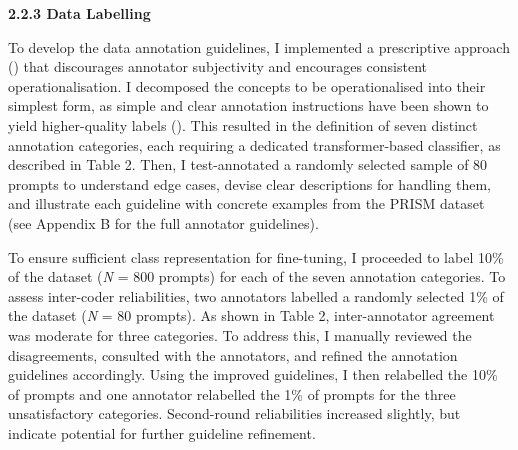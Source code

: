 \documentclass[
  12pt,
]{article}
\begin{document}
\textbf{2.2.3 Data Labelling}

To develop the data annotation guidelines, I implemented a prescriptive approach () that discourages annotator subjectivity and encourages consistent operationalisation. I decomposed the concepts to be operationalised into their simplest form, as simple and clear annotation instructions have been shown to yield higher-quality labels (). This resulted in the definition of seven distinct annotation categories, each requiring a dedicated transformer-based classifier, as described in Table 2. Then, I test-annotated a randomly selected sample of 80 prompts to understand edge cases, devise clear descriptions for handling them, and illustrate each guideline with concrete examples from the PRISM dataset (see Appendix B for the full annotator guidelines).

To ensure sufficient class representation for fine-tuning, I proceeded to label 10\% of the dataset (\emph{N} = 800 prompts) for each of the seven annotation categories. To assess inter-coder reliabilities, two annotators labelled a randomly selected 1\% of the dataset (\emph{N} = 80 prompts). As shown in Table 2, inter-annotator agreement was moderate for three categories. To address this, I manually reviewed the disagreements, consulted with the annotators, and refined the annotation guidelines accordingly. Using the improved guidelines, I then relabelled the 10\% of prompts and one annotator relabelled the 1\% of prompts for the three unsatisfactory categories. Second-round reliabilities increased slightly, but indicate potential for further guideline refinement.
\end{document}
